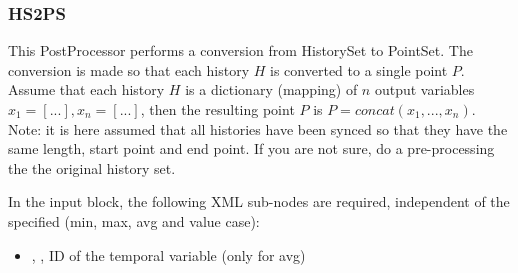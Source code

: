 \subsubsection{HS2PS}
\label{HS2PS}

This PostProcessor performs a conversion from HistorySet to PointSet.
The conversion is made so that each history $H$ is converted to a single point $P$.
Assume that each history $H$ is a dictionary (mapping) of $n$ output variables $x_1=[...],x_n=[...]$, then the resulting point $P$ is $P=concat(x_1,...,x_n)$.
Note: it is here assumed that all histories have been synced so that they have the same length, start point and end point. 
If you are not sure, do a pre-processing the the original history set.


In the  input block, the following XML sub-nodes are required,
independent of the  specified (min, max, avg and value case):

\begin{itemize}
   \item {}, , ID of the temporal variable (only for avg)
\end{itemize}
